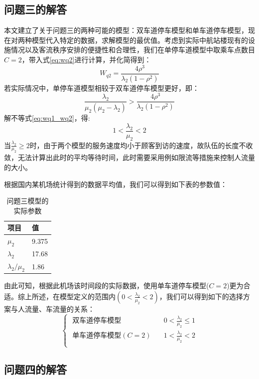 \documentclass{cumcm}
\begin{document}
\subsection{问题三的解答}
本文建立了关于问题三的两种可能的模型：双车道停车模型和单车道停车模型，现在对两种模型代入特定的数据，求解模型的最优值。考虑到实际中航站楼现有的设施情况以及客流秩序安排的便捷性和合理性，我们在单停车道模型中取乘车点数目$C=2$，带入式\ref{eq:wq2}进行计算，并化简得到：
\begin{equation}
	W_{q2}=\frac{4\rho^3}{\lambda_2(1-\rho^2)}
\end{equation}
若实际情况中，单停车道模型相较于双车道停车模型更好，即：
\begin{equation}
	\frac{\lambda_2}{\mu_2(\mu_2-\lambda_2)}>\frac{4\rho^3}{\lambda_2(1-\rho^2)}
	\label{eq:wq1_wq2}
\end{equation}
解不等式\ref{eq:wq1_wq2}，得:
\begin{equation}
	1<\frac{\lambda_2}{\mu_2}<2
\end{equation}
当$\frac{\lambda_2}{\mu_2}\ge2$时，由于两个模型的服务速度均小于顾客到访的速度，故队伍的长度不收敛，无法计算出此时的平均等待时间，此时需要采用例如限流等措施来控制人流量的大小。\par
根据国内某机场统计得到的数据平均值\cite{flightdata}，我们可以得到如下表的参数值：
\begin{table}[H]
	\centering
	\caption{问题三模型的实际参数} 
	\label{table-symbol}
	\begin{tabular*}{0.31\textwidth}{p{3.5cm}p{2cm}}
		\toprule
		项目 & 值 \\
		\midrule
		$\mu_2$ & 9.375 \\
		$\lambda_2$ & 17.68 \\
		$\lambda_2/\mu_2$ & 1.86 \\
		\bottomrule
	\end{tabular*}
\end{table}
由此可知，根据此机场该时间段的实际数据，使用单车道停车模型($C=2$)更为合适。综上所述，在模型定义的范围内$(0<\frac{\lambda_2}{\mu_2}<2)$，我们可以得到如下的选择方案与人流量、车流量的关系：
\begin{equation}
	\begin{cases}
		\mbox{  双车道停车模型}\quad & 0<\frac{\lambda_2}{\mu_2}\le1 \\
		\mbox{  单车道停车模型}(C=2)\quad & 1<\frac{\lambda_2}{\mu_2}<2 \\
	\end{cases}
\end{equation}
\subsection{问题四的解答}
\end{document}
